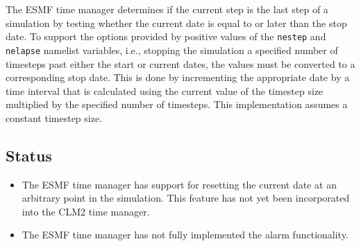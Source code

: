 \documentclass[12pt]{article}
\newcommand{\code}[1]{\texttt{#1}}
\begin{document}
The ESMF time manager determines if the current step is the last step of a
simulation by testing whether the current date is equal to or later than
the stop date.  To support the options provided by positive values of the
\code{nestep} and \code{nelapse} namelist variables, i.e., stopping the
simulation a specified number of timesteps past either the start or current
dates, the values must be converted to a corresponding stop date.  This is
done by incrementing the appropriate date by a time interval that is
calculated using the current value of the timestep size multiplied by the
specified number of timesteps.  This implementation assumes a constant
timestep size.

\subsection{Status}

\begin{itemize}

\item
The ESMF time manager has support for resetting the current date at an
arbitrary point in the simulation.  This feature has not yet been
incorporated into the CLM2 time manager.

\item
The ESMF time manager has not fully implemented the alarm functionality.

\end{itemize}
\end{document}
